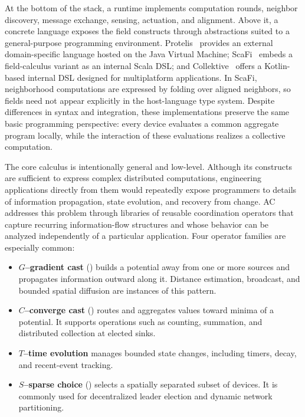 At the bottom of the stack, 
 a runtime implements computation rounds, neighbor discovery, message exchange, 
 sensing, actuation, and alignment. 
% 
Above it, 
 a concrete language exposes the field constructs through abstractions suited
 to a general-purpose programming environment.
% 
Protelis~\cite{DBLP:conf/sac/PianiniVB15} 
 provides an external domain-specific language hosted on the Java Virtual Machine;
 ScaFi~\cite{DBLP:journals/softx/CasadeiVAP22} embeds a field-calculus variant
 as an internal Scala DSL; and Collektive~\cite{DBLP:conf/acsos/Cortecchia24}
 offers a Kotlin-based internal DSL designed for multiplatform applications.
%
In ScaFi, 
 neighborhood computations are expressed by folding over aligned neighbors, 
 so fields need not appear explicitly in the host-language type system. 
% 
Despite differences in syntax and integration, 
 these implementations preserve the same basic programming perspective:
 every device evaluates a common aggregate program locally, while the
 interaction of these evaluations realizes a collective computation.

The core calculus is intentionally general and low-level.
% 
Although its constructs are sufficient to express complex distributed
 computations, engineering applications directly from them would repeatedly
 expose programmers to details of information propagation, state evolution,
 and recovery from change.
%
\gls{AC} addresses this problem through libraries of reusable coordination
 operators that capture recurring information-flow structures and whose
 behavior can be analyzed independently of a particular application.
% 
Four operator families are especially common:

\begin{itemize}
  \item \textbf{$G$--gradient cast} () builds a potential away from one or more
  sources and propagates information outward along it. Distance estimation,
  broadcast, and bounded spatial diffusion are instances of this pattern.

  \item \textbf{$C$--converge cast} () routes and aggregates values toward minima
  of a potential. It supports operations such as counting, summation, and
  distributed collection at elected sinks.

  \item \textbf{$T$--time evolution} manages bounded state changes, including
  timers, decay, and recent-event tracking.

  \item \textbf{$S$--sparse choice} () selects a spatially separated subset of
  devices. It is commonly used for decentralized leader election and dynamic
  network partitioning.
\end{itemize}


